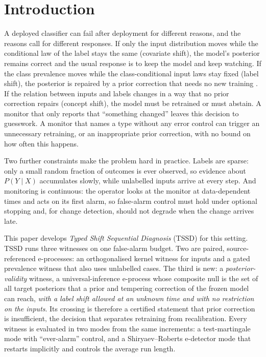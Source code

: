 \section{Introduction}
\label{sec:intro}

A deployed classifier can fail after deployment for different reasons, and the reasons call for different responses. If only the input distribution moves while the conditional law of the label stays the same (covariate shift), the model's posterior remains correct and the usual response is to keep the model and keep watching. If the class prevalence moves while the class-conditional input laws stay fixed (label shift), the posterior is repaired by a prior correction that needs no new training \citep{saerens2002,lipton2018,alexandari2020}. If the relation between inputs and labels changes in a way that no prior correction repairs (concept shift), the model must be retrained or must abstain. A monitor that only reports that ``something changed'' leaves this decision to guesswork. A monitor that names a type without any error control can trigger an unnecessary retraining, or an inappropriate prior correction, with no bound on how often this happens.

Two further constraints make the problem hard in practice. Labels are sparse: only a small random fraction of outcomes is ever observed, so evidence about $P(Y\mid X)$ accumulates slowly, while unlabelled inputs arrive at every step. And monitoring is continuous: the operator looks at the monitor at data-dependent times and acts on its first alarm, so false-alarm control must hold under optional stopping and, for change detection, should not degrade when the change arrives late.

This paper develops \emph{Typed Shift Sequential Diagnosis} (TSSD) for this setting. TSSD runs three witnesses on one false-alarm budget. Two are paired, source-referenced e-processes: an orthogonalised kernel witness for inputs and a gated prevalence witness that also uses unlabelled cases. The third is new: a \emph{posterior-validity} witness, a universal-inference e-process \citep{wasserman2020} whose composite null is the set of all target posteriors that a prior and tempering correction of the frozen model can reach, \emph{with a label shift allowed at an unknown time and with no restriction on the inputs}. Its crossing is therefore a certified statement that prior correction is insufficient, the decision that separates retraining from recalibration. Every witness is evaluated in two modes from the same increments: a test-martingale mode with ``ever-alarm'' control, and a Shiryaev--Roberts e-detector mode \citep{shin2024edetectors} that restarts implicitly and controls the average run length.

